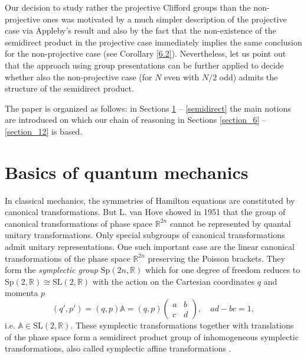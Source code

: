 \documentclass[10pt]{amsart}
\theoremstyle{plain}
\theoremstyle{definition}
\theoremstyle{remark}%
\newcommand{\SL}{\mathrm{SL}}
\newcommand{\Sp}{\mathrm{Sp}}
\begin{document}
Our decision to study rather the projective Clifford groups than the non-project\-ive ones was motivated by a much simpler description of the projective case via Appleby's result and also by the fact that the non-existence of the semidirect product in the projective case immediately implies the same conclusion for the non-projective case (see Corollary \ref{6.2}). Nevertheless, let us point out that the approach using group presentations can be further applied to decide whether also the non-projective case (for $N$ even with $N/2$ odd) admits the structure of the semidirect product.



The paper is organized as follows:
in Sections \ref{section_2} -- \ref{semidirect} the main notions are introduced 
on which our chain of reasoning in Sections \ref{section_6} -- \ref{section_12} is based.



\section{Basics of quantum mechanics}\label{section_2}

In  classical mechanics, the symmetries of Hamilton equations 
are constituted by canonical transformations. 
But L. van Hove showed in 1951 \cite{Tilgner,VanHove} that
the group of canonical transformations of phase space $\mathbb{R}^{2n}$
cannot be represented by quantal unitary transformations. 
Only special subgroups of canonical transformations admit unitary representations. 
One such important case are the linear canonical transformations
of the phase space $\mathbb{R}^{2n}$ preserving the Poisson
brackets. They form the \textit{symplectic group} $\Sp(2n,\mathbb{R})$
which for one degree of freedom reduces to
$\Sp(2,\mathbb{R})\cong \SL(2,\mathbb{R})$ with the action on the
Cartesian coordinates $q$ and momenta $p$
\begin{equation}
(q',p') = (q,p)\mathbb{A}=(q,p) \left( \begin{array}{cc}
a & b \\
c & d
\end{array}  \right), \quad ad-bc=1,
\end{equation}
i.e. $\mathbb{A} \in \SL(2,\mathbb{R})$.
These symplectic transformations together with translations of the phase space 
form a semidirect product group of inhomogeneous symplectic transformations,
also called symplectic affine transformations \cite{bolt1, Gross}.
\end{document}
